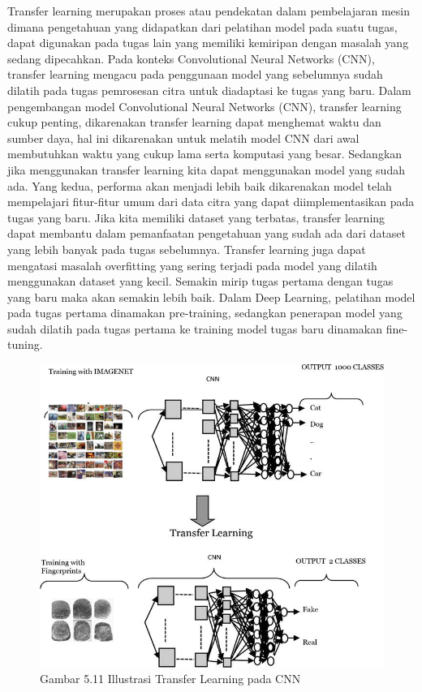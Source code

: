 \documentclass[
  letterpaper,
  DIV=11,
  numbers=noendperiod]{scrreprt}
\begin{document}
Transfer learning merupakan proses atau pendekatan dalam pembelajaran
mesin dimana pengetahuan yang didapatkan dari pelatihan model pada suatu
tugas, dapat digunakan pada tugas lain yang memiliki kemiripan dengan
masalah yang sedang dipecahkan. Pada konteks Convolutional Neural
Networks (CNN), transfer learning mengacu pada penggunaan model yang
sebelumnya sudah dilatih pada tugas pemrosesan citra untuk diadaptasi ke
tugas yang baru. Dalam pengembangan model Convolutional Neural Networks
(CNN), transfer learning cukup penting, dikarenakan transfer learning
dapat menghemat waktu dan sumber daya, hal ini dikarenakan untuk melatih
model CNN dari awal membutuhkan waktu yang cukup lama serta komputasi
yang besar. Sedangkan jika menggunakan transfer learning kita dapat
menggunakan model yang sudah ada. Yang kedua, performa akan menjadi
lebih baik dikarenakan model telah mempelajari fitur-fitur umum dari
data citra yang dapat diimplementasikan pada tugas yang baru. Jika kita
memiliki dataset yang terbatas, transfer learning dapat membantu dalam
pemanfaatan pengetahuan yang sudah ada dari dataset yang lebih banyak
pada tugas sebelumnya. Transfer learning juga dapat mengatasi masalah
overfitting yang sering terjadi pada model yang dilatih menggunakan
dataset yang kecil. Semakin mirip tugas pertama dengan tugas yang baru
maka akan semakin lebih baik. Dalam Deep Learning, pelatihan model pada
tugas pertama dinamakan pre-training, sedangkan penerapan model yang
sudah dilatih pada tugas pertama ke training model tugas baru dinamakan
fine-tuning.

\begin{figure}

{\centering \includegraphics{Asset/transferlearning.png}

}

\caption{Gambar 5.11 Illustrasi Transfer Learning pada CNN}

\end{figure}
\end{document}
